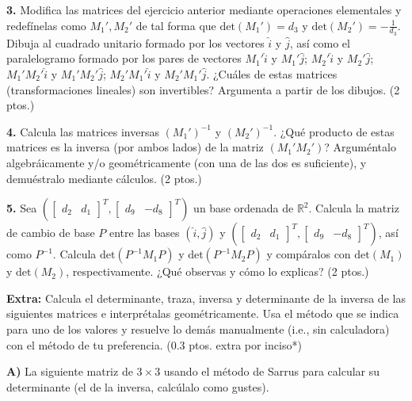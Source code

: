 \documentclass[a4paper]{article}
\begin{document}
\vspace{5mm}
\textbf{3.} Modifica las matrices del ejercicio anterior mediante operaciones elementales y redefínelas como $M_1', M_2'$ de tal forma que $\text{det}(M_1')=d_3$ y $\text{det}(M_2')=-\frac{1}{d_3}$. Dibuja al cuadrado unitario formado por los vectores $\hat{i}$ y $\hat{j}$, así como el paralelogramo formado por los pares de vectores $M_1'\hat{i}$ y $M_1'\hat{j}$; $M_2'\hat{i}$ y $M_2'\hat{j}$; $M_1'M_2'\hat{i}$ y $M_1'M_2'\hat{j}$; $M_2'M_1'\hat{i}$ y $M_2'M_1'\hat{j}$. ¿Cuáles de estas matrices (transformaciones lineales) son invertibles? Argumenta a partir de los dibujos. (2 ptos.)

\vspace{5mm}
\textbf{4.} Calcula las matrices inversas $(M_1')^{-1}$ y $(M_2')^{-1}$. ¿Qué producto de estas matrices es la inversa (por ambos lados) de la matriz $(M_1'M_2')$? Arguméntalo algebráicamente y/o geométricamente (con una de las dos es suficiente), y demuéstralo mediante cálculos. (2 ptos.)

\vspace{5mm}
\textbf{5.} Sea $(\begin{bmatrix}d_2 & d_1\end{bmatrix}^T,  \begin{bmatrix}d_9 & -d_8\end{bmatrix}^T)$ un base ordenada de $\mathbb{R}^2$. Calcula la matriz de cambio de base $P$ entre las bases $(\hat{i},\hat{j})$ y $(\begin{bmatrix}d_2 & d_1\end{bmatrix}^T,  \begin{bmatrix}d_9 & -d_8\end{bmatrix}^T)$, así como $P^{-1}$. Calcula $\text{det}(P^{-1}M_1P)$ y $\text{det}(P^{-1}M_2P)$ y compáralos con $\text{det}(M_1)$ y $\text{det}(M_2)$, respectivamente. ¿Qué observas y cómo lo explicas? (2 ptos.)

\vspace{5mm}
\textbf{Extra:} Calcula el determinante, traza, inversa y determinante de la inversa de las siguientes matrices  e interprétalas geométricamente. Usa el método que se indica para uno de los valores y resuelve lo demás manualmente (i.e., sin calculadora) con el método de tu preferencia. (0.3 ptos. extra por inciso*)

\vspace{5mm}
\textbf{A)} La siguiente matriz de $3\times 3$ usando el método de Sarrus para calcular su determinante (el de la inversa, calcúlalo como gustes). 
\end{document}
